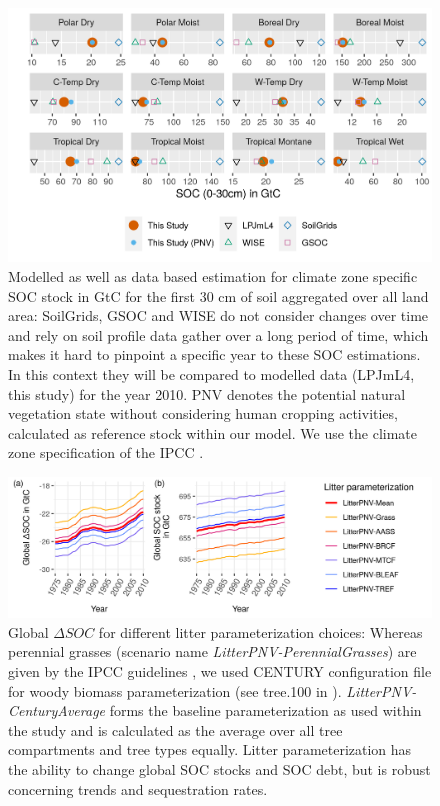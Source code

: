 \documentclass[gc, manuscript]{copernicus}
\begin{document}
\begin{figure}[H]
\includegraphics[width=16cm]{../ResultNotebooks/Output/Images/reg_comparisonfigure} 
\caption{Modelled as well as data based estimation for climate zone specific SOC stock in GtC for the first 30 cm of soil aggregated over all land area: SoilGrids, GSOC and WISE do not consider changes over time and rely on soil profile data gather over a long period of time, which makes it hard to pinpoint a specific year to these SOC estimations. In this context they will be compared to modelled data (LPJmL4, this study) for the year 2010. PNV denotes the potential natural vegetation state without considering human cropping activities, calculated as reference stock within our model. We use the climate zone specification of the IPCC \citep{eggleston_ipcc_2006}.}
\label{fig:SOCreg}
\end{figure}

\begin{figure}[H]
\includegraphics[width=16cm]{../ResultNotebooks/Output/Images/scenario_litter} 
\caption{Global $\Delta SOC$ for different litter parameterization choices: Whereas perennial grasses (scenario name \textit{LitterPNV-PerennialGrasses}) are given by the IPCC guidelines \citep{calvo_buendia_ipcc_2019}, we used CENTURY configuration file for woody biomass parameterization (see tree.100 in \citealt{century_model_2000}). \textit{LitterPNV-CenturyAverage} forms the baseline parameterization as used within the study and is calculated as the average over all tree compartments and tree types equally. Litter parameterization has the ability to change global SOC stocks and SOC debt, but is robust concerning trends and sequestration rates.}
\label{fig:SOClitter}
\end{figure}
\noappendix
\end{document}
